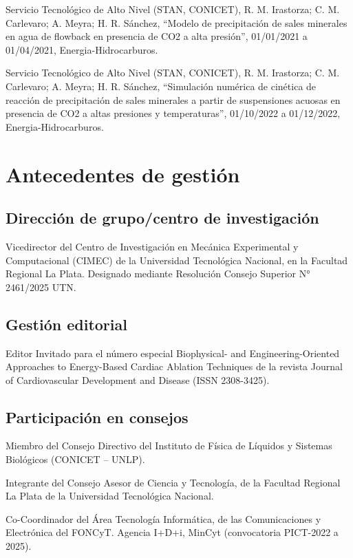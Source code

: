 \documentclass[margin,line]{res}
\begin{document}
\begin{resume}
Servicio Tecnológico de Alto Nivel (STAN, CONICET), R. M. Irastorza; C. M. Carlevaro; A. Meyra; H. R. Sánchez, ``Modelo de precipitación de sales minerales en agua de flowback en presencia de CO2 a alta presión'', 01/01/2021 a 01/04/2021, Energia-Hidrocarburos.

Servicio Tecnológico de Alto Nivel (STAN, CONICET), R. M. Irastorza; C. M. Carlevaro; A. Meyra; H. R. Sánchez, ``Simulación numérica de cinética de reacción de precipitación de sales minerales a partir de suspensiones acuosas en presencia de CO2 a altas presiones y temperaturas'', 01/10/2022 a 01/12/2022, Energia-Hidrocarburos.

\section{ Antecedentes de gestión}

\subsection{ Dirección de grupo/centro de investigación}

Vicedirector del Centro de Investigación en Mecánica Experimental y Computacional (CIMEC) de la Universidad Tecnológica Nacional, en la Facultad Regional La Plata. Designado mediante Resolución Consejo Superior N° 2461/2025 UTN.

\subsection{ Gestión editorial}

Editor Invitado para el número especial Biophysical- and Engineering-Oriented Approaches to Energy-Based Cardiac Ablation Techniques de la revista Journal of Cardiovascular Development and Disease (ISSN 2308-3425).

\subsection{ Participación en consejos}

Miembro del Consejo Directivo del Instituto de Física de Líquidos y Sistemas Biológicos (CONICET – UNLP).

Integrante del Consejo Asesor de Ciencia y Tecnología, de la Facultad Regional La Plata de la Universidad Tecnológica Nacional.

Co-Coordinador del Área Tecnología Informática, de las Comunicaciones y Electrónica del FONCyT. Agencia I+D+i, MinCyt (convocatoria PICT-2022 a 2025).


\end{resume}
\end{document}

